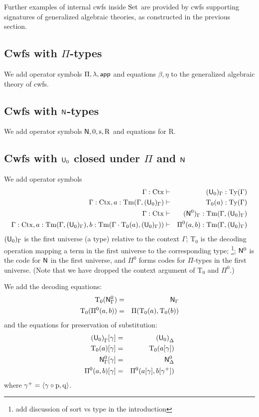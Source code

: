 \documentclass{lmcs}
\newcommand{\s}{\mathrm{s}}
\newcommand{\Rec}{\mathrm{R}}
\newcommand{\Ta}{\mathrm{T}}
\def\Ctx{\mathrm{Ctx}}
\begin{document}
Further examples of internal cwfs inside ${\rm Set}$ are provided by cwfs supporting signatures of generalized algebraic theories, as constructed in the previous section.

\subsection{Cwfs with $\Pi$-types} 
We add operator symbols $\Pi, \lambda, \mathsf{app}$ and equations $\beta, \eta$ to the generalized algebraic theory of cwfs. 

\subsection{Cwfs with $\mathsf{N}$-types} 
We add operator symbols $\N, 0, \s, \Rec$ and equations for $\Rec$.

\subsection{Cwfs with $\mathsf{U}_0$ closed under $\Pi$ and $\mathsf{N}$} 
We add operator symbols
\begin{eqnarray*}
\Gamma : \Ctx &\vdash& (\U_0)_\Gamma : \Ty(\Gamma)\\
\Gamma : \Ctx, a : \Tm(\Gamma,(\U_0)_\Gamma) &\vdash& {\Ta_0}(a) : \Ty(\Gamma)\\
\Gamma : \Ctx &\vdash& (\N^0)_\Gamma : \Tm(\Gamma,(\U_0)_\Gamma) \\
\Gamma : \Ctx, 
a : \Tm(\Gamma,(\U_0)_\Gamma), 
b :  \Tm(\Gamma \cdot \Ta_0(a), (\U_0)_\Gamma))
&\vdash&
 \Pi^0(a,b) : \Tm(\Gamma,(\U_0)_\Gamma)
\end{eqnarray*}
$(\mathsf{U}_0)_\Gamma$ is the first universe (a type) relative to the context $\Gamma$; $\Ta_0$ is the decoding operation mapping a term in the first universe to the corresponding type; \footnote{add discussion of sort vs type in the introduction}; $\mathsf{N}^0$ is the code for $\mathsf{N}$ in the first universe, and $\Pi^0$ forms codes for $\Pi$-types in the first universe. (Note that we have dropped the context argument of $\Ta_0$ and $\Pi^0$.)

We add the decoding equations:
\begin{eqnarray*}
\Ta_0(\N^0_\Gamma) &=& \N_\Gamma\\
\Ta_0(\Pi^0(a,b)) &=& \Pi(\Ta_0(a),\Ta_0(b))
\end{eqnarray*}
and the equations for preservation of substitution:
\begin{eqnarray*}
{(\U_0)}_\Gamma [ \gamma ] &=& {(\U_0)}_\Delta\\
\Ta_0(a) [ \gamma ] &=& \Ta_0(a[ \gamma ] )\\
\N^0_\Gamma [ \gamma ] &=&\N^0_\Delta\\
\Pi^0(a,b)[ \gamma ] &=& \Pi^0(a [ \gamma ], b[ \gamma^+ ])
\end{eqnarray*}
where $\gamma^+ = \langle \gamma \circ \mathrm{p}, \mathrm{q} \rangle$.
\end{document}
